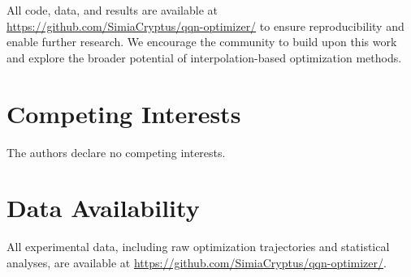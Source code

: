 All code, data, and results are available at \url{https://github.com/SimiaCryptus/qqn-optimizer/} to ensure reproducibility and enable further research.
We encourage the community to build upon this work and explore the broader potential of interpolation-based optimization methods.

\hypertarget{competing-interests}{%
\section{Competing Interests}\label{competing-interests}}

The authors declare no competing interests.

\hypertarget{data-availability}{%
\section{Data Availability}\label{data-availability}}

All experimental data, including raw optimization trajectories and statistical analyses, are available at \url{https://github.com/SimiaCryptus/qqn-optimizer/}.
